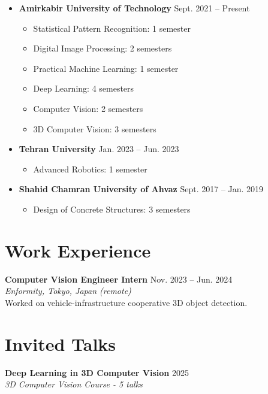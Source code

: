 \documentclass[10pt, letterpaper]{article}
\begin{document}
    \begin{itemize}
        \item \textbf{Amirkabir University of Technology} \hfill {Sept. 2021 – Present}
        \begin{itemize}
            \small
            \item Statistical Pattern Recognition: 1 semester
            \item Digital Image Processing: 2 semesters
            \item Practical Machine Learning: 1 semester
            \item Deep Learning: 4 semesters
            \item Computer Vision: 2 semesters
            \item 3D Computer Vision: 3 semesters
        \end{itemize}
        
        \item \textbf{Tehran University} \hfill {Jan. 2023 – Jun. 2023}
        \begin{itemize}
            \small
            \item Advanced Robotics: 1 semester
        \end{itemize}
        
        \item \textbf{Shahid Chamran University of Ahvaz} \hfill {Sept. 2017 – Jan. 2019}
        \begin{itemize}
            \small
            \item Design of Concrete Structures: 3 semesters
        \end{itemize}
    \end{itemize}


\section*{\textcolor{primaryColor}{Work Experience}}
    \noindent\textbf{Computer Vision Engineer Intern} \hfill {Nov. 2023 – Jun. 2024} \\
    \textit{Enformity, Tokyo, Japan (remote)} \\
    Worked on vehicle-infrastructure cooperative 3D object detection.

\section*{\textcolor{primaryColor}{Invited Talks}}
    \noindent\textbf{Deep Learning in 3D Computer Vision} \hfill {2025} \\
    \textit{3D Computer Vision Course - 5 talks}
    
\end{document}
